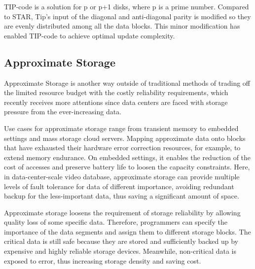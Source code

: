 \documentclass[sigconf]{acmart}
\begin{document}
TIP-code \cite{tip} is a solution for p or p+1 disks, where p is a prime number. Compared to STAR, Tip's input of the diagonal and anti-diagonal parity is modified so they are evenly distributed among all the data blocks. This minor modification has enabled TIP-code to achieve optimal update complexity.


\subsection{Approximate Storage}
Approximate Storage is another way outside of traditional methods of trading off the limited resource budget with the costly reliability requirements, which recently receives more attentions since data centers are faced with storage pressure from the ever-increasing data.

Use cases for approximate storage range from transient memory to embedded settings and mass storage cloud servers. Mapping approximate data onto blocks that have exhausted their hardware error correction resources, for example, to extend memory endurance. On embedded settings, it enables the reduction of the cost of accesses and preserve battery life to loosen the capacity constraints. \cite{sampson2014approximate} Here, in data-center-scale video database, approximate storage can provide multiple levels of fault tolerance for data of different importance, avoiding redundant backup for the less-important data, thus saving a significant amount of space.


Approximate storage loosens the requirement of storage reliability by allowing quality loss of some specific data. Therefore, programmers can specify the importance of the data segments and assign them to different storage blocks. The critical data is still safe because they are stored and sufficiently backed up by expensive and highly reliable storage devices. Meanwhile, non-critical data is exposed to error, thus increasing storage density and saving cost.

\end{document}
